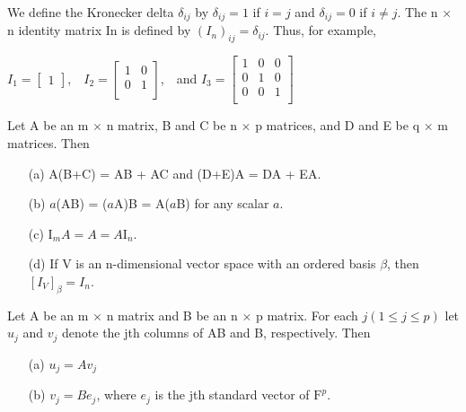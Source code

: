 \newpage

\begin{defn} $ $\\
We define the Kronecker delta $\delta_{ij}$ by $\delta_{ij} = 1$ if $i = j$ and $\delta_{ij} = 0$ if $i \neq j$. The n $\times$ n identity matrix In is defined by $(I_n)_{ij} = \delta_{ij}$.
Thus, for example,

\begin{center}

$I_1 = \left[\begin{matrix}
	1	
\end{matrix}\right]$,\ \ 
$I_2 = \left[\begin{matrix}
	1 & 0\\  
	0 & 1 \\	
\end{matrix}\right]$,\ \ and   
$I_3 = \left[\begin{matrix}
	1 & 0 & 0 \\
	0 & 1 & 0 \\
	0 & 0 & 1 \\ 	
\end{matrix}\right]$

\end{center}
\end{defn}

\begin{thm*}[2.12] $ $\\
 Let A be an m $\times$ n matrix, B and C be n $\times$ p matrices, and D and E be q $\times$ m matrices. Then
 
 \begin{enumerate}
 
 	\item [(a)]A(B+C) = AB + AC and (D+E)A = DA + EA.
 	\item [(b)]$a$(AB) = ($a$A)B = A($a$B) for any scalar $a$.
 	\item [(c)]$\mathrm{I}_mA = A = A\mathrm{I}_n$.
 	\item [(d)]If V is an n-dimensional vector space with an ordered basis $\beta$, then $[I_V]_\beta = I_n$.

 \end{enumerate}

\end{thm*}

\begin{thm*}[2.13] $ $\\
Let A be an m $\times$ n matrix and B be an n $\times$ p matrix. For each $ j (1 \leq j \leq p)$ let $u_j$ and $v_j$ denote the jth columns of AB and B, respectively. Then
\begin{enumerate}
	\item [(a)] $u_j = Av_j$
	\item [(b)] $v_j = Be_j$, where $e_j$ is the jth standard vector of $\mathrm{F}^p$.
 \end{enumerate}	
\end{thm*}

